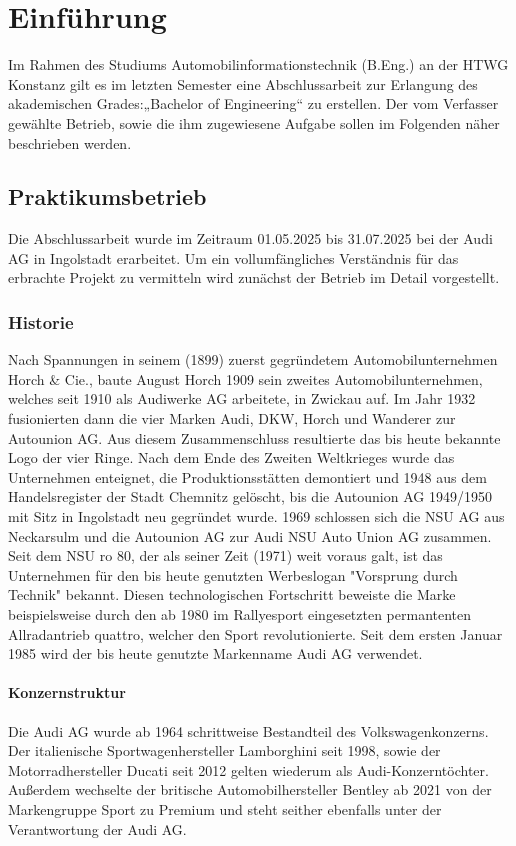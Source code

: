 \chapter{Einführung} %

\label{Einführung} 
    Im Rahmen des Studiums Automobilinformationstechnik (B.Eng.) an der HTWG Konstanz gilt es im letzten Semester eine Abschlussarbeit zur Erlangung des akademischen Grades:„Bachelor of Engineering“ zu erstellen. Der vom Verfasser gewählte Betrieb, sowie die ihm zugewiesene Aufgabe sollen im Folgenden näher beschrieben werden.

    \section{Praktikumsbetrieb}
        Die Abschlussarbeit wurde im Zeitraum 01.05.2025 bis 31.07.2025 bei der Audi AG in Ingolstadt erarbeitet. Um ein vollumfängliches Verständnis für das erbrachte Projekt zu vermitteln wird zunächst der Betrieb im Detail vorgestellt.
        \subsection{Historie}
        Nach Spannungen in seinem (1899) zuerst gegründetem Automobilunternehmen Horch \& Cie., baute August Horch 1909 sein zweites Automobilunternehmen, welches seit 1910 als Audiwerke AG arbeitete, in Zwickau auf. Im Jahr 1932 fusionierten dann die vier Marken Audi, DKW, Horch und Wanderer zur Autounion AG. Aus diesem Zusammenschluss resultierte das bis heute bekannte Logo der vier Ringe.
        Nach dem Ende des Zweiten Weltkrieges wurde das Unternehmen enteignet, die Produktionsstätten demontiert und 1948 aus dem Handelsregister der Stadt Chemnitz gelöscht, bis die Autounion AG 1949/1950 mit Sitz in Ingolstadt neu gegründet wurde.
        1969 schlossen sich die NSU AG aus Neckarsulm und die Autounion AG zur Audi NSU Auto Union AG zusammen.
        Seit dem NSU ro 80, der als seiner Zeit (1971) weit voraus galt, ist das Unternehmen für den bis heute genutzten Werbeslogan "Vorsprung durch Technik" bekannt. Diesen technologischen Fortschritt beweiste die Marke beispielsweise durch den ab 1980 im Rallyesport eingesetzten permantenten Allradantrieb quattro, welcher den Sport revolutionierte.
        Seit dem ersten Januar 1985 wird der bis heute genutzte Markenname Audi AG verwendet. \cite{AudiHistory}       
        
        \subsubsection{Konzernstruktur}
        Die Audi AG wurde ab 1964 schrittweise Bestandteil des Volkswagenkonzerns. Der italienische Sportwagenhersteller Lamborghini seit 1998, sowie der Motorradhersteller Ducati seit 2012 gelten wiederum als Audi-Konzerntöchter. Außerdem wechselte der britische Automobilhersteller Bentley ab 2021 von der Markengruppe Sport zu Premium und steht seither ebenfalls unter der Verantwortung der Audi AG. 
        

